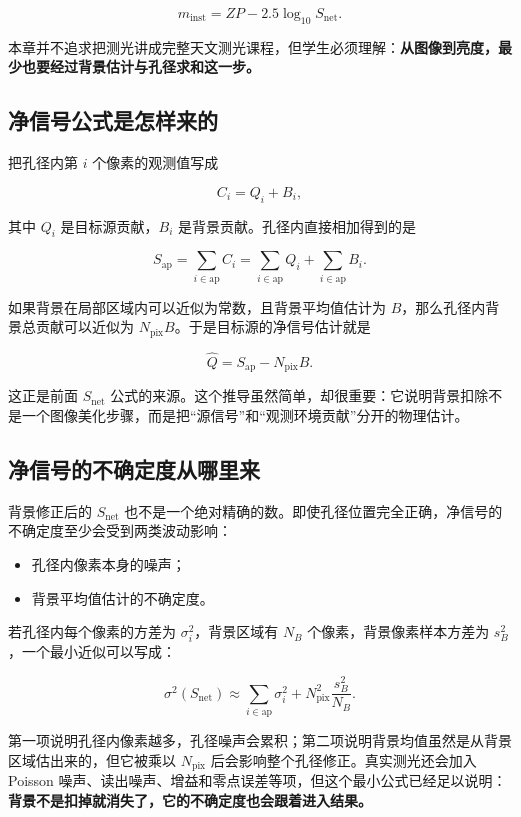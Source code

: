 \[
m_{\mathrm{inst}} = ZP - 2.5\log_{10} S_{\mathrm{net}}.
\]

本章并不追求把测光讲成完整天文测光课程，但学生必须理解：\textbf{从图像到亮度，最少也要经过背景估计与孔径求和这一步。}

\subsection{净信号公式是怎样来的}

把孔径内第 $i$ 个像素的观测值写成

\[
C_i = Q_i + B_i,
\]

其中 $Q_i$ 是目标源贡献，$B_i$ 是背景贡献。孔径内直接相加得到的是

\[
S_{\mathrm{ap}} = \sum_{i\in \mathrm{ap}} C_i
= \sum_{i\in \mathrm{ap}} Q_i + \sum_{i\in \mathrm{ap}} B_i.
\]

如果背景在局部区域内可以近似为常数，且背景平均值估计为 $B$，那么孔径内背景总贡献可以近似为 $N_{\mathrm{pix}}B$。于是目标源的净信号估计就是

\[
\hat{Q} = S_{\mathrm{ap}} - N_{\mathrm{pix}}B.
\]

这正是前面 $S_{\mathrm{net}}$ 公式的来源。这个推导虽然简单，却很重要：它说明背景扣除不是一个图像美化步骤，而是把“源信号”和“观测环境贡献”分开的物理估计。

\subsection{净信号的不确定度从哪里来}

背景修正后的 $S_{\mathrm{net}}$ 也不是一个绝对精确的数。即使孔径位置完全正确，净信号的不确定度至少会受到两类波动影响：

\begin{itemize}
    \item 孔径内像素本身的噪声；
    \item 背景平均值估计的不确定度。
\end{itemize}

若孔径内每个像素的方差为 $\sigma_i^2$，背景区域有 $N_B$ 个像素，背景像素样本方差为 $s_B^2$，一个最小近似可以写成：

\[
\sigma^2(S_{\mathrm{net}})
\approx
\sum_{i\in \mathrm{ap}}\sigma_i^2
+ N_{\mathrm{pix}}^2\frac{s_B^2}{N_B}.
\]

第一项说明孔径内像素越多，孔径噪声会累积；第二项说明背景均值虽然是从背景区域估出来的，但它被乘以 $N_{\mathrm{pix}}$ 后会影响整个孔径修正。真实测光还会加入 Poisson 噪声、读出噪声、增益和零点误差等项，但这个最小公式已经足以说明：\textbf{背景不是扣掉就消失了，它的不确定度也会跟着进入结果。}

